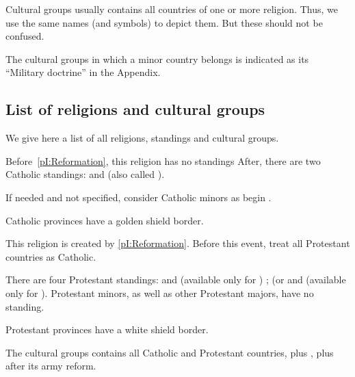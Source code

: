 \aparag Cultural groups usually contains all countries of one or more
religion. Thus, we use the same names (and symbols) to depict them. But these
should not be confused.

\aparag The cultural groups in which a minor country belongs is indicated as
its ``Military doctrine'' in the Appendix.



\subsection{List of religions and cultural groups}

\label{chThePowers:List of religions}
\aparag We give here a list of all religions, standings and cultural groups.


\aparag Before~\ref{pI:Reformation}, this religion has no standings
\bparag After, there are two Catholic standings:  and
 (also called ).

\bparag If needed and not specified, consider Catholic minors as begin
\CATHCR.

\aparag Catholic provinces have a golden shield border.

\aparag This religion is created by \ref{pI:Reformation}.
\bparag Before this event, treat all Protestant countries as Catholic.

%
\aparag There are four Protestant standings:  and
 (available only for \ANG) ;  (or
 and  (available only for \SUE).
\bparag Protestant minors, as well as other Protestant majors, have no
standing.

\aparag Protestant provinces have a white shield border.

\aparag The  cultural groups contains all Catholic and Protestant
countries, plus \POL, plus \RUS after its army reform.

